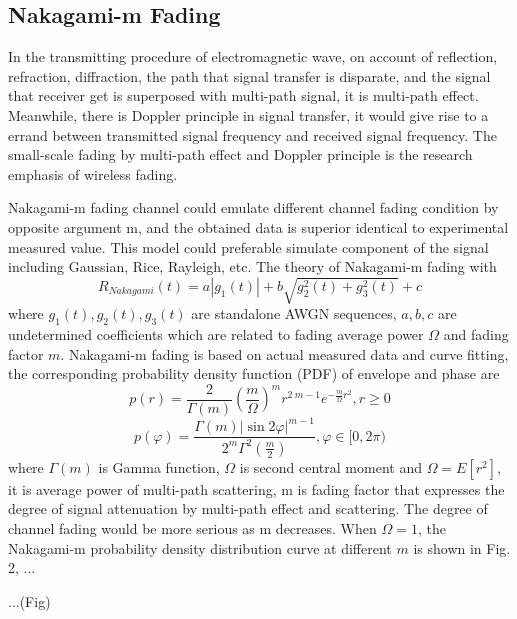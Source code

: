 \documentclass[conference]{IEEEtran}
\begin{document}
\subsection{Nakagami-m Fading}
In the transmitting procedure of electromagnetic wave, on account of reflection, refraction, diffraction, the path that signal transfer is disparate, and the signal that receiver get is superposed with multi-path signal, it is multi-path effect. Meanwhile, there is Doppler principle in signal transfer, it would give rise to a errand between transmitted signal frequency and received signal frequency. The small-scale fading by multi-path effect and Doppler principle is the research emphasis of wireless fading.

Nakagami-m fading channel could emulate different channel fading condition by opposite argument m, and the obtained data is superior identical to experimental measured value. This model could preferable simulate  component of the signal including Gaussian, Rice, Rayleigh, etc. The theory of Nakagami-m fading with
\begin{equation}
	{R}_{Nakagami }({t}) = {a}\left|{g}_{1}({t})\right| + {b} \sqrt{{g}_{2}^{2}({t}) + {g}_{3}^{2}({t})} + {c}
\end{equation}
where $g_1(t), g_2(t), g_3(t)$ are standalone AWGN sequences, $a, b, c$ are undetermined coefficients which are related to fading average power $\Omega$ and fading factor $m$. Nakagami-m fading is based on actual measured data and curve fitting, the corresponding probability density function (PDF) of envelope and phase are
\begin{equation}
	{p}({r}) = \frac{2}{\Gamma({m})}\left(\frac{m}{\Omega}\right)^{m} {r}^{2 {~m}-1} {e}^{-\frac{m}{\Omega} {r}^{2}}, {r} \geq 0
\end{equation}
\begin{equation}
	{p}(\varphi) = \frac{\Gamma({m})|\sin 2 \varphi|^{{m}-1}}{2^{{m}} \Gamma^{2}\left(\frac{{m}}{2}\right)}, \varphi \in[0,2 \pi)
\end{equation}
where $\Gamma(m)$ is Gamma function, $\Omega$ is second central moment and $\Omega = E[r^2]$, it is average power of multi-path scattering, m is fading factor that expresses the degree of signal attenuation by multi-path effect and scattering. The degree of channel fading would be more serious as m decreases. When $\Omega = 1$, the Nakagami-m probability density distribution curve at different $m$ is shown in Fig. 2, ...

...(Fig)
\end{document}
